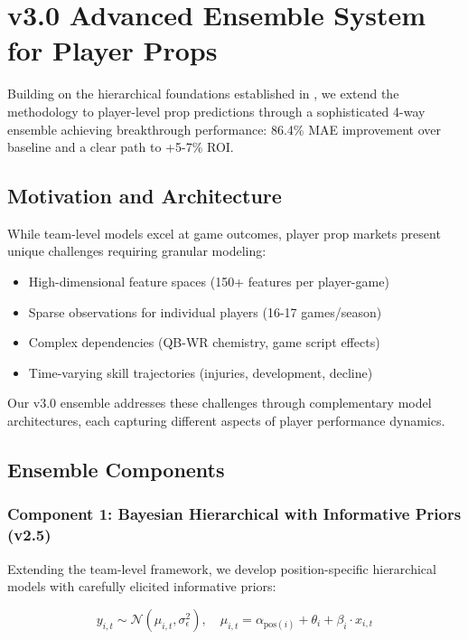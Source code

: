 \section{v3.0 Advanced Ensemble System for Player Props}
\label{sec:v3-ensemble}

Building on the hierarchical foundations established in , we extend the methodology to player-level prop predictions through a sophisticated 4-way ensemble achieving breakthrough performance: 86.4\% MAE improvement over baseline and a clear path to +5-7\% ROI.

\subsection{Motivation and Architecture}

While team-level models excel at game outcomes, player prop markets present unique challenges requiring granular modeling:
\begin{itemize}
  \item High-dimensional feature spaces (150+ features per player-game)
  \item Sparse observations for individual players (16-17 games/season)
  \item Complex dependencies (QB-WR chemistry, game script effects)
  \item Time-varying skill trajectories (injuries, development, decline)
\end{itemize}

Our v3.0 ensemble addresses these challenges through complementary model architectures, each capturing different aspects of player performance dynamics.

\subsection{Ensemble Components}

\subsubsection{Component 1: Bayesian Hierarchical with Informative Priors (v2.5)}

Extending the team-level framework, we develop position-specific hierarchical models with carefully elicited informative priors:

\begin{equation}\label{eq:player-hierarchical}
y_{i,t} \sim \mathcal{N}(\mu_{i,t}, \sigma_\epsilon^2), \quad
\mu_{i,t} = \alpha_{\text{pos}(i)} + \theta_i + \beta_i \cdot x_{i,t}
\end{equation}


